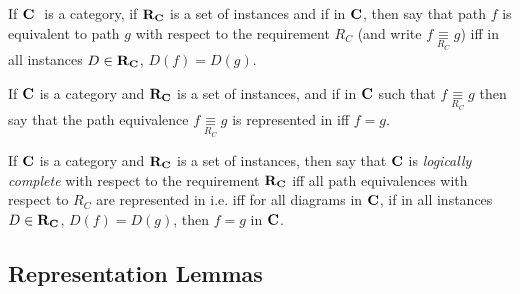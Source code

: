 \documentclass[10pt,a4paper]{article}
\theoremstyle{remark}
\renewcommand{\term}[1]{\textit{#1}}  %
\begin{document}
\newcommand{\pequiv}[1][R_C]{\underset{#1}{\equiv}}

\begin{definition}
If $\textbf{C}\ $ is a  category, if $\textbf{R}_{\textbf{C}}$ is a set of instances
 and if \fgpralleldiag in $\textbf{C}$, then say that path $f$ is equivalent to path $g$ with respect to the requirement $R_C$ 
 (and write $f \pequiv g$) iff
in all instances $D \in \textbf{R}_{\textbf{C}}$, $D(f)=D(g)$.
\end{definition}

\begin{definition}
If $\textbf{C}$ is a  category and $\textbf{R}_{\textbf{C}}$ is a set of instances,
 and if \fgpralleldiag in $\textbf{C}$ such that $f \pequiv g$
 then say that the path equivalence $f \pequiv g$ is represented in \catcw iff
 $f=g$.
\end{definition}

\begin{oldtt}
\begin{definition}
If $\textbf{C}$ is a  category and $\textbf{R}_{\textbf{C}}$ is a set of instances,
 then say that  $\textbf{C}$ is \term{logically complete} with respect 
to the requirement $\textbf{R}_{\textbf{C}}$ iff all path equivalences with respect to $R_C$ are represented in \catcw 
i.e. iff for all diagrams \fgpralleldiag in $\textbf{C}$,  
if in all instances $D \in \textbf{R}_{\textbf{C}}$, $D(f)=D(g)$,  then $f=g$ in $\textbf{C}$.
\end{definition}
\end{oldtt}

\subsection{Representation Lemmas}
\end{document}
